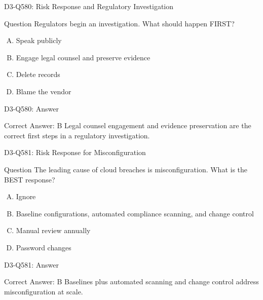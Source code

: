\documentclass{beamer}
\begin{document}
	\begin{frame}{D3-Q580: Risk Response and Regulatory Investigation}
		\begin{block}{Question}
			Regulators begin an investigation. What should happen FIRST?
		\end{block}
		\begin{enumerate}[(A)]
			\item Speak publicly
			\item Engage legal counsel and preserve evidence
			\item Delete records
			\item Blame the vendor
		\end{enumerate}
	\end{frame}
	\begin{frame}{D3-Q580: Answer}
		\begin{block}{Correct Answer: B}
			Legal counsel engagement and evidence preservation are the correct first steps in a regulatory investigation.
		\end{block}
	\end{frame}
	
	\begin{frame}{D3-Q581: Risk Response for Misconfiguration}
		\begin{block}{Question}
			The leading cause of cloud breaches is misconfiguration. What is the BEST response?
		\end{block}
		\begin{enumerate}[(A)]
			\item Ignore
			\item Baseline configurations, automated compliance scanning, and change control
			\item Manual review annually
			\item Password changes
		\end{enumerate}
	\end{frame}
	\begin{frame}{D3-Q581: Answer}
		\begin{block}{Correct Answer: B}
			Baselines plus automated scanning and change control address misconfiguration at scale.
		\end{block}
	\end{frame}
	
\end{document}
